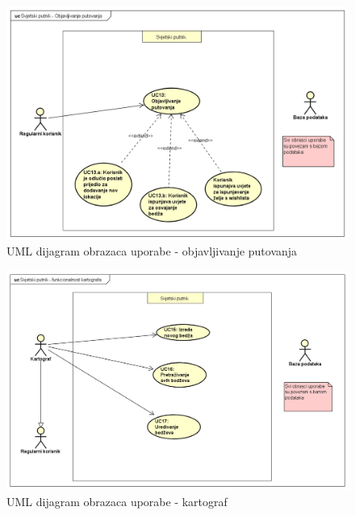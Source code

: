                 		\begin{figure}[H]
                			\includegraphics[scale=0.4]{slike/UC-objavljivanjeputovanja.png} %
                			\centering
                			\caption{UML dijagram obrazaca uporabe - objavljivanje putovanja}
                			
                		\end{figure}
        			
        				\begin{figure}[H]
                			\includegraphics[scale=0.4]{slike/UC-kartograf.png} %
                			\centering
                			\caption{UML dijagram obrazaca uporabe - kartograf}
                			
                		\end{figure}
        			
